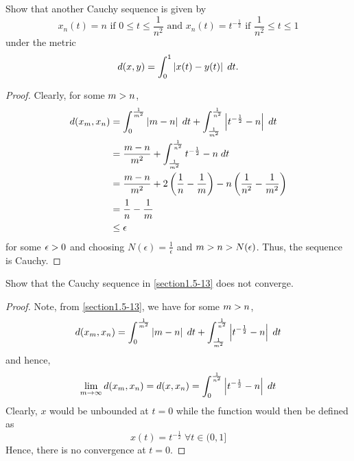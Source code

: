 \begin{question}
    Show that another Cauchy sequence is given by
    \[x_n(t) = n \text{ if } 0 \leq t\leq \frac{1}{n^2} \text{ and } x_n(t) = t^{-\frac{1}{2}} \text{ if } \frac{1}{n^2} \leq t \leq 1\]
    under the metric
    \[d(x,y) = \int_0^1 \left\lvert x(t) - y(t) \right\rvert \; dt.\]
    \label{section1.5-13}
\end{question}
\begin{proof}
    Clearly, for some $m > n$,
    \begin{align*}
        d(x_m , x_n) &= \int_{0}^{\frac{1}{m^2}} \left\lvert m-n \right\rvert \; dt + \int_{\frac{1}{m^2}}^{\frac{1}{n^2}} \left\lvert t^{-\frac{1}{2}} - n \right\rvert \; dt 
        \\
        &= \frac{m-n}{m^2} + \int_{\frac{1}{m^2}}^{\frac{1}{n^2}} t^{-\frac{1}{2}} - n \; dt 
        \\
        &= \frac{m-n}{m^2} + 2\left( \frac{1}{n} - \frac{1}{m}\right) -n\left(\frac{1}{n^2} - \frac{1}{m^2} \right)
        \\
        &= \frac{1}{n} - \frac{1}{m}
        \\
        &\leq \epsilon
    \end{align*}
    for some $\epsilon > 0$ and choosing $N(\epsilon) = \frac{1}{\epsilon}$ and $m > n > N(\epsilon)$. Thus, the sequence is Cauchy.
\end{proof}

\begin{question}
    Show that the Cauchy sequence in \ref{section1.5-13} does not converge.
    \label{section1.5-14}
\end{question}
\begin{proof}
    Note, from \ref{section1.5-13}, we have for some $m > n$,
    \[d(x_m , x_n) = \int_{0}^{\frac{1}{m^2}} \left\lvert m-n \right\rvert \; dt + \int_{\frac{1}{m^2}}^{\frac{1}{n^2}} \left\lvert t^{-\frac{1}{2}} - n \right\rvert \; dt \]
    and hence, 
    \[\lim_{m \rightarrow \infty} d(x_m , x_n)  =d(x,x_n) = \int_{0}^{\frac{1}{n^2}} \left\lvert t^{-\frac{1}{2}} - n \right\rvert \; dt\]
    Clearly, $x$ would be unbounded at $t = 0$ while the function would then be defined as 
    \[x(t) = t^{-\frac{1}{2}} \; \forall t \in (0,1]\]
    Hence, there is no convergence at $t = 0$.
\end{proof}

